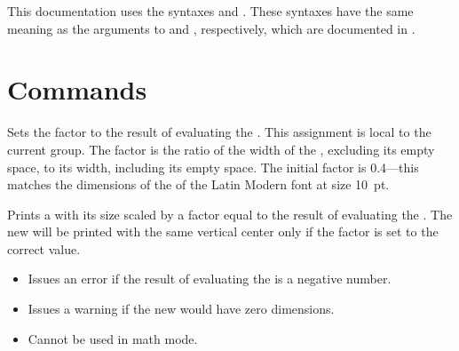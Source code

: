 \documentclass{beerydoc}
\begin{document}
This documentation uses the syntaxes  and .
These syntaxes have the same meaning as the arguments to  and
, respectively, which are documented in .


\section{Commands}
\label{sec:commands}

\begin{function}{\settextbulletfactor}
  \begin{syntax}
     
  \end{syntax}
  Sets the  factor to the result of evaluating the
  .
  This assignment is local to the current group.
  The  factor is the ratio of the width of the ,
  excluding its empty space, to its width, including its empty space.
  The initial  factor is \num{0.4}---this matches the
  dimensions of the  of the Latin Modern font at size
  \qty{10}{pt}.
\end{function}

\begin{function}{\scaletextbullet}
  \begin{syntax}
     
  \end{syntax}
  Prints a  with its size scaled by a factor equal to the
  result of evaluating the .
  The new  will be printed with the same vertical center only
  if the  factor is set to the correct value.

  \begin{itemize}
    \item
    Issues an error if the result of evaluating the  is a
    negative number.
    \item
    Issues a warning if the new  would have zero dimensions.
    \item
    Cannot be used in math mode.
  \end{itemize}
\end{function}
\end{document}
